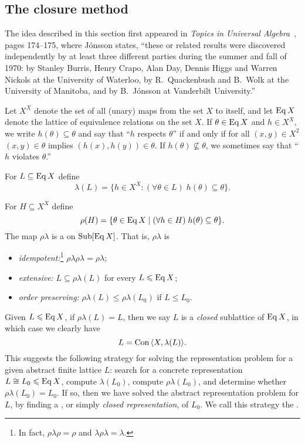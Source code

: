 \subsection{The closure method}
\label{sec:closure-method}
The idea described in this section
first appeared in \emph{Topics in Universal Algebra}~\cite{Jonsson:1972}, pages
174--175, where J\'onsson states, ``these or related results were discovered
independently by at least three different parties during the summer and fall of
1970: by Stanley Burris, Henry Crapo, Alan Day, Dennis Higgs and Warren Nickols
at the University of Waterloo, by R.~Quackenbush and B.~Wolk at the University
of Manitoba, and by B.~J\'{o}nsson at Vanderbilt University.''

Let $X^X$ denote the set of all (unary) maps from the set $X$ to itself, and let 
$\operatorname{Eq} X$ denote the lattice of equivalence relations on the set $X$.  If $\theta
\in \operatorname{Eq} X$ and $h\in X^X$, we write $h(\theta) \subseteq \theta$ and say
that ``$h$ respects $\theta$'' if and only if for all $(x,y)\in X^2$ $(x,y)\in
\theta$ implies 
$(h(x),h(y)) \in \theta$.  If $h(\theta) \nsubseteq \theta$, we sometimes say
that ``$h$ violates $\theta$.''

For $L\subseteq \operatorname{Eq} X$ define
\[
\lambda(L) = \{h\in X^X: (\forall \theta \in L) \; h(\theta) \subseteq \theta \}.
\]

For $H\subseteq X^X$ define
\[
\rho(H) = \{\theta \in \operatorname{Eq} X \mid   (\forall h\in H) \; h(\theta) \subseteq \theta\}.
\]
The map $\rho \lambda$ is a  on $\operatorname{Sub}[\operatorname{Eq} X]$.
That is, $\rho \lambda$ is
\begin{itemize}
\item \emph{idempotent:}\footnote{In fact, $\rho \lambda \rho = \rho$ and 
  $\lambda \rho \lambda = \lambda$.} $\rho \lambda \rho \lambda = \rho \lambda$;
\item \emph{extensive:} $L \subseteq \rho \lambda (L)$ for every $L \leqslant \operatorname{Eq} X$;
\item \emph{order preserving:} $\rho \lambda (L) \leq \rho \lambda (L_0)$ if $L \leq L_0$.
\end{itemize}
Given $L\leqslant \operatorname{Eq} X$, if $\rho\lambda(L) = L$, then we say $L$ is a 
\emph{closed} sublattice of $\operatorname{Eq} X$, in which case we clearly have
\[L = \operatorname{Con\,} \langle X, \lambda(L)\rangle.\]
This suggests the following strategy for solving the representation problem for a
given abstract finite lattice $L$: search for a concrete representation $L \cong
L_0\leqslant \operatorname{Eq} X$,
compute $\lambda(L_0)$, compute $\rho\lambda(L_0)$, and determine whether 
$\rho\lambda(L_0) = L_0$.  If so, then we have solved the abstract representation
problem for $L$, by finding a , or simply
\emph{closed representation}, of $L_0$.  We call this strategy the .

